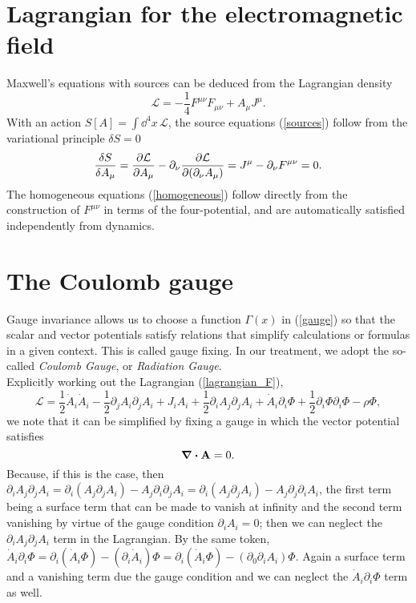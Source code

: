 \section{Lagrangian for the electromagnetic field}
Maxwell's equations with sources can be deduced from the Lagrangian density
\begin{equation}
    \mathcal{L}=-\frac{1}{4}F^{\mu\nu}F_{\mu\nu}+A_\mu J^\mu .
    \label{lagrangian_F}
\end{equation}
With an action $S[A]=\int\dd^4x\,\mathcal{L}$, the source equations (\ref{sources}) follow from the variational principle $\delta S=0$ 
\begin{equation}
    \fdv{S}{A_\mu}=\pdv{\mathcal{L}}{A_\mu}-\partial_\nu\pdv{\mathcal{L}}{(\partial_\nu A_\mu)}=J^\mu-\partial_\nu F^{\mu\nu}=0.
\end{equation}
The homogeneous equations (\ref{homogeneous}) follow directly from the construction of $F^{\mu\nu}$ in terms of the four-potential, and are automatically satisfied independently from dynamics. 
\section{The Coulomb gauge}
Gauge invariance allows us to choose a function $\Gamma(x)$ in (\ref{gauge}) so that the scalar and vector potentials satisfy relations that simplify calculations or formulas in a given context. This is called gauge fixing. In our treatment, we adopt the so-called \textit{Coulomb Gauge}, or \textit{Radiation Gauge}.\\

Explicitly working out the Lagrangian (\ref{lagrangian_F}),
\begin{equation}
    \mathcal{L}=\frac{1}{2}\dot{A}_i\dot{A}_i-\frac{1}{2}\partial_jA_i\partial_jA_i+J_iA_i+\frac{1}{2}\partial_iA_j\partial_jA_i+\dot{A}_i\partial_i\Phi+\frac{1}{2}\partial_i\Phi\partial_i\Phi-\rho\Phi,
    \label{explicit_lagrangian}
\end{equation}
we note that it can be simplified by fixing a gauge in which the vector potential satisfies
\begin{equation}
    \div\vb{A}=0.
    \label{coulomb_gauge}
\end{equation}
 Because, if this is the case, then $\partial_iA_j\partial_jA_i=\partial_i(A_j\partial_j A_i)-A_j\partial_i\partial_jA_i=\partial_i(A_j\partial_j A_i)-A_j\partial_j\partial_iA_i$, the first term being a surface term that can be made to vanish at infinity and the second term vanishing by virtue of the gauge condition $\partial_iA_i=0$; then we can neglect the $\partial_iA_j\partial_jA_i$ term in the Lagrangian. By the same token, $\dot{A}_i\partial_i\Phi=\partial_i(\dot{A}_i\Phi)-(\partial_i\dot{A}_i)\Phi=\partial_i(\dot{A}_i\Phi)-(\partial_0\partial_i{A}_i)\Phi$. Again a surface term and a vanishing term due the gauge condition and we can neglect the $\dot{A}_i\partial_i\Phi$ term as well.

